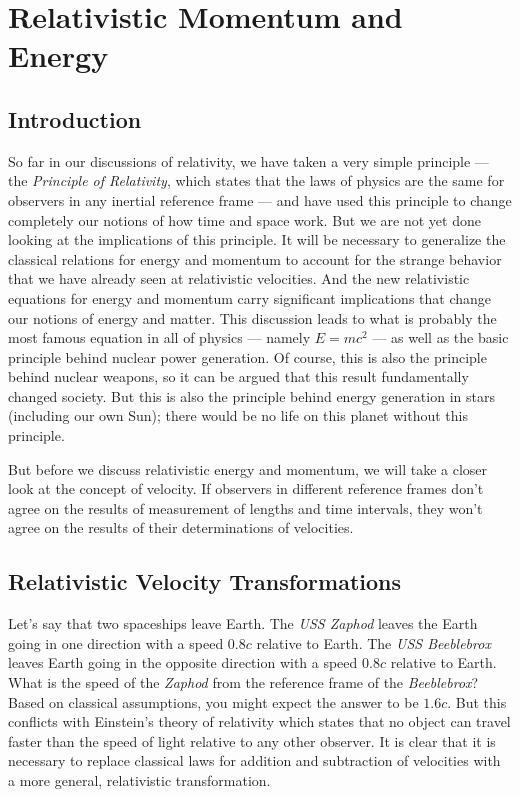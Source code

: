 \chapter{Relativistic Momentum and Energy}
\label{chap:relativity_pande}



\section{Introduction}

So far in our discussions of relativity, we have taken a very simple
principle --- the \emph{Principle of Relativity}, which states that the
laws of physics are the same for observers in any inertial reference
frame --- and have used this principle to change completely our notions
of how time and space work.  But we are not yet done looking at the
implications of this principle.  It will be necessary to generalize
the classical relations for energy and momentum to account for the
strange behavior that we have already seen at relativistic velocities.
And the new relativistic equations for energy and momentum carry
significant implications that change our notions of energy and matter.
This discussion leads to what is probably the most famous equation in
all of physics --- namely $E = mc^2$ --- as well as the basic principle
behind nuclear power generation.  Of course, this is also the principle 
behind nuclear weapons, so it can be argued that this result fundamentally
changed society.  But this is also the principle behind energy generation
in stars (including our own Sun); there would be no life on this planet
without this principle.

But before we discuss relativistic energy and momentum, we will take
a closer look at the concept of velocity.  If observers in different
reference frames don't agree on the results of measurement of lengths 
and time intervals, they won't agree on the results of their determinations
of velocities. 


\section{Relativistic Velocity Transformations}

Let's say that two spaceships leave Earth.  The \emph{USS Zaphod}
leaves the Earth going in one direction with a speed $0.8c$ relative
to Earth.  The \emph{USS Beeblebrox} leaves Earth going in the opposite
direction with a speed $0.8c$ relative to Earth.  What is the speed
of the \emph{Zaphod} from the reference frame of the \emph{Beeblebrox}?
Based on classical assumptions, you might expect the answer to be
$1.6c$.  But this conflicts with Einstein's theory of relativity which
states that no object can travel faster than the speed of light
relative to any other observer.  It is clear that it is necessary to
replace classical laws for addition and subtraction of velocities with
a more general, relativistic transformation.


